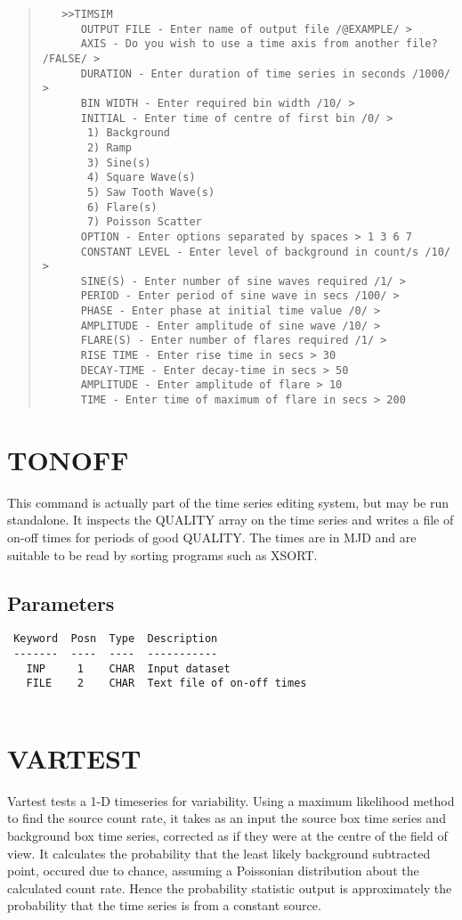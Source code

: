 \documentclass{book}
\renewcommand{\_}{{\tt\char'137}}     %
\begin{document}
\begin{quote}\begin{verbatim}
   >>TIMSIM
      OUTPUT FILE - Enter name of output file /@EXAMPLE/ >
      AXIS - Do you wish to use a time axis from another file? /FALSE/ >
      DURATION - Enter duration of time series in seconds /1000/ >
      BIN WIDTH - Enter required bin width /10/ >
      INITIAL - Enter time of centre of first bin /0/ >
       1) Background
       2) Ramp
       3) Sine(s)
       4) Square Wave(s)
       5) Saw Tooth Wave(s)
       6) Flare(s)
       7) Poisson Scatter
      OPTION - Enter options separated by spaces > 1 3 6 7
      CONSTANT LEVEL - Enter level of background in count/s /10/ >
      SINE(S) - Enter number of sine waves required /1/ >
      PERIOD - Enter period of sine wave in secs /100/ >
      PHASE - Enter phase at initial time value /0/ >
      AMPLITUDE - Enter amplitude of sine wave /10/ >
      FLARE(S) - Enter number of flares required /1/ >
      RISE TIME - Enter rise time in secs > 30
      DECAY-TIME - Enter decay-time in secs > 50
      AMPLITUDE - Enter amplitude of flare > 10
      TIME - Enter time of maximum of flare in secs > 200
\end{verbatim}\end{quote}
\section{TONOFF}
This command is actually part of the time series editing system,
but may be run standalone. It inspects the QUALITY array on the
time series and writes a file of on-off times for periods of
good QUALITY. The times are in MJD and are suitable to be read
by sorting programs such as XSORT.
 
\subsection{Parameters}
\begin{verbatim}
 Keyword  Posn  Type  Description
 -------  ----  ----  -----------
   INP     1    CHAR  Input dataset
   FILE    2    CHAR  Text file of on-off times
 
\end{verbatim}\section{VARTEST}
Vartest tests a 1-D timeseries for variability. Using a maximum
likelihood method to find the source count rate, it takes as an
input the source box time series and background box time series,
corrected as if they were at the centre of the field of view. It
calculates the probability that the least likely background
subtracted point, occured due to chance, assuming a Poissonian
distribution about the calculated count rate. Hence the
probability statistic output is approximately the probability
that the time series is from a constant source.
 
\end{document}

